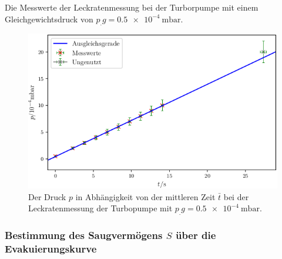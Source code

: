 \begin{table}
\centering
\caption{Die Messwerte der Leckratenmessung bei der Turborpumpe mit einem Gleichgewichtsdruck von $p_.g = \SI{0.5e-4}{\milli\bar}$.}

\label{tab:TL4}
\end{table}

\begin{figure}
\centering
\includegraphics[width=\linewidth-70pt,height=\textheight-70pt,keepaspectratio]{content/images/TL4.png}
\caption{Der Druck $p$ in Abhängigkeit von der mittleren Zeit $\bar{t}$ bei der Leckratenmessung der Turbopumpe  mit $p_.g = \SI{0.5e-4}{\milli\bar}$.}
\label{fig:TL4}
\end{figure}

\subsubsection{Bestimmung des Saugvermögens $S$ über die Evakuierungskurve}

